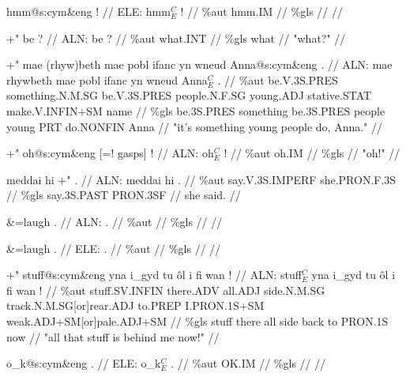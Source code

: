 \documentclass[a4paper,10pt]{article}
\begin{document}
\ex
\begingl[lingstyle=gergl]
\glchat hmm@s:cym\&eng ! //
\glsurface ELE:  hmm$^{C}_{E}$ !  //
\glauto \%aut  hmm{\scriptsize .IM}   //
\glmanual \%gls     //
\gleng  //
\endgl
\xe

\ex
\begingl[lingstyle=gergl]
\glchat +" be ? //
\glsurface ALN:  be ?  //
\glauto \%aut  what{\scriptsize .INT}   //
\glmanual \%gls  what   //
\gleng "what?" //
\endgl
\xe

\ex
\begingl[lingstyle=gergl]
\glchat +" mae (rhyw)beth mae pobl ifanc yn wneud Anna@s:cym\&eng . //
\glsurface ALN:  mae rhywbeth mae pobl ifanc yn wneud Anna$^{C}_{E}$ .  //
\glauto \%aut  be{\scriptsize .V.3S.PRES} something{\scriptsize .N.M.SG} be{\scriptsize .V.3S.PRES} people{\scriptsize .N.F.SG} young{\scriptsize .ADJ} stative{\scriptsize .STAT} make{\scriptsize .V.INFIN+SM} name   //
\glmanual \%gls  be{\scriptsize .3S.PRES} something be{\scriptsize .3S.PRES} people young PRT do{\scriptsize .NONFIN} Anna   //
\gleng "it's something young people do, Anna." //
\endgl
\xe

\ex
\begingl[lingstyle=gergl]
\glchat +" oh@s:cym\&eng [=! gasps] ! //
\glsurface ALN:  oh$^{C}_{E}$ !  //
\glauto \%aut  oh{\scriptsize .IM}   //
\glmanual \%gls     //
\gleng "oh!" //
\endgl
\xe

\ex
\begingl[lingstyle=gergl]
\glchat meddai hi +" . //
\glsurface ALN:  meddai hi .  //
\glauto \%aut  say{\scriptsize .V.3S.IMPERF} she{\scriptsize .PRON.F.3S}   //
\glmanual \%gls  say{\scriptsize .3S.PAST} PRON{\scriptsize .3SF}   //
\gleng she said. //
\endgl
\xe

\ex
\begingl[lingstyle=gergl]
\glchat \&=laugh . //
\glsurface ALN:  .  //
\glauto \%aut    //
\glmanual \%gls    //
\gleng  //
\endgl
\xe

\ex
\begingl[lingstyle=gergl]
\glchat \&=laugh . //
\glsurface ELE:  .  //
\glauto \%aut    //
\glmanual \%gls    //
\gleng  //
\endgl
\xe

\ex
\begingl[lingstyle=gergl]
\glchat +" stuff@s:cym\&eng yna i\_gyd tu ôl i fi wan ! //
\glsurface ALN:  stuff$^{C}_{E}$ yna i\_gyd tu ôl i fi wan !  //
\glauto \%aut  stuff{\scriptsize .SV.INFIN} there{\scriptsize .ADV} all{\scriptsize .ADJ} side{\scriptsize .N.M.SG} track{\scriptsize .N.M.SG[or]rear.ADJ} to{\scriptsize .PREP} I{\scriptsize .PRON.1S+SM} weak{\scriptsize .ADJ+SM[or]pale.ADJ+SM}   //
\glmanual \%gls  stuff there all side back to PRON{\scriptsize .1S} now   //
\gleng "all that stuff is behind me now!" //
\endgl
\xe

\ex
\begingl[lingstyle=gergl]
\glchat o\_k@s:cym\&eng . //
\glsurface ELE:  o\_k$^{C}_{E}$ .  //
\glauto \%aut  OK{\scriptsize .IM}   //
\glmanual \%gls     //
\gleng  //
\endgl
\xe
\end{document}
